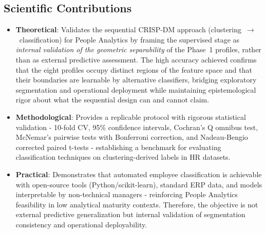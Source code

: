 \documentclass[alpha-refs,english]{RBCA_v3.0}
\begin{document}
\subsection{Scientific Contributions}
\begin{itemize}
    \item \textbf{Theoretical}: Validates the sequential CRISP-DM approach (clustering~$\rightarrow$~classification) for People Analytics by framing the supervised stage as \textit{internal validation of the geometric separability} of the Phase~1 profiles, rather than as external predictive assessment. The high accuracy achieved confirms that the eight profiles occupy distinct regions of the feature space and that their boundaries are learnable by alternative classifiers, bridging exploratory segmentation and operational deployment while maintaining epistemological rigor about what the sequential design can and cannot claim.
    \item \textbf{Methodological}: Provides a replicable protocol with rigorous statistical validation - 10-fold CV, 95\% confidence intervals, Cochran's Q omnibus test, McNemar's pairwise tests with Bonferroni correction, and Nadeau-Bengio corrected paired t-tests - establishing a benchmark for evaluating classification techniques on clustering-derived labels in HR datasets.
    \item \textbf{Practical}: Demonstrates that automated employee classification is achievable with open-source tools (Python/scikit-learn), standard ERP data, and models interpretable by non-technical managers - reinforcing People Analytics feasibility in low analytical maturity contexts. Therefore, the objective is not external predictive generalization but internal validation of segmentation consistency and operational deployability.
\end{itemize}
\end{document}

